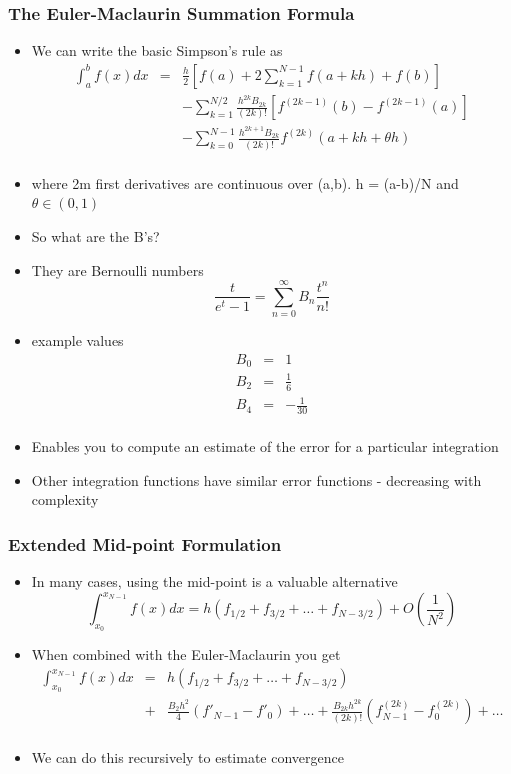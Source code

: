 \documentclass[10pt]{beamer}
\begin{document}
\begin{frame}
  \frametitle{The Euler-Maclaurin Summation Formula}
{\small
  \begin{itemize}
  \item We can write the basic Simpson's rule as
    \[
      \begin{array}{rcl}
      \int_a^b f(x) dx &=& \frac{h}{2} \left[ f(a) + 2 \sum_{k=1}^{N-1} f (a + kh) + f(b) \right]\\
                       && - \sum_{k=1}^{N/2} \frac{h^{2k} B_{2k}}{(2k)!}[ f^{(2k-1)}(b) - f^{(2k-1)}(a)] \\
                       && - \sum_{k=0}^{N-1} \frac{h^{2k+1} B_{2k}}{(2k)!} f^{(2k)}(a + kh + \theta h) \\
      \end{array}
    \]
  \item where 2m first derivatives are continuous over (a,b). h = (a-b)/N and $\theta\in(0,1)$
  \item So what are the B's?
  \item They are Bernoulli numbers
    \[
      \frac{t}{e^t-1} = \sum_{n=0}^{\infty} B_n \frac{t^n}{n!}
    \]
  \item example values
    \[
      \begin{array}{rcl}
        B_0 & = & 1\\
        B_2 & = & \frac{1}{6} \\
        B_4 & = & - \frac{1}{30}\\
      \end{array}
    \]
  \item Enables you to compute an estimate of the error for a particular integration
  \item Other integration functions have similar error functions - decreasing with complexity
  \end{itemize}
  }
\end{frame}

\begin{frame}
  \frametitle{Extended Mid-point Formulation}
  \begin{itemize}
  \item In many cases, using the mid-point is a valuable alternative
    \[
      \int_{x_0}^{x_{N-1}} f(x) dx = h (f_{1/2} + f_{3/2} + \ldots + f_{N-3/2}) + O(\frac{1}{N^2})
    \]
  \item When combined with the Euler-Maclaurin you get
    \[
      \begin{array}{rcl}
        \int_{x_0}^{x_{N-1}} f(x) dx &=& h (f_{1/2} + f_{3/2} + \ldots + f_{N-3/2}) \\
                & + & \frac{B_2 h^2}{4} (f'_{N-1} - f'_0) + \ldots + \frac{B_{2k} h^{2k}}{(2k)!} (f^{(2k)}_{N-1} - f^{(2k)}_0) + \ldots \\
      \end{array}
    \]
  \item We can do this recursively to estimate convergence
  \end{itemize}
\end{frame}
\end{document}
